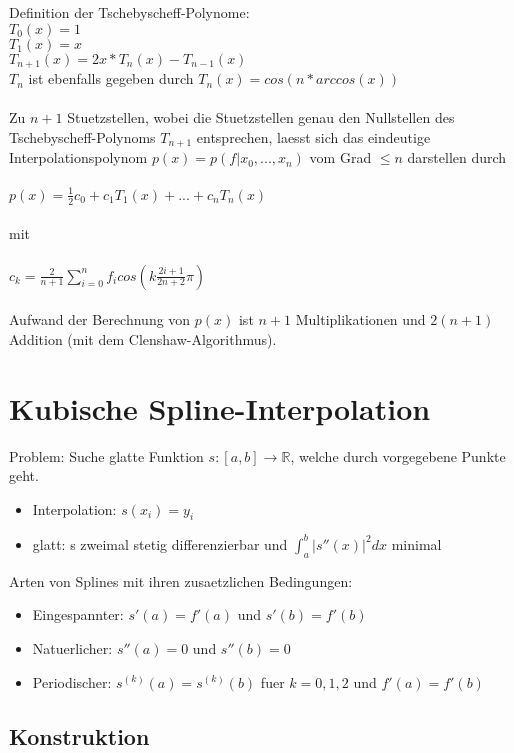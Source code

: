 \documentclass[a4paper]{scrreprt}
\begin{document}
Definition der Tschebyscheff-Polynome:\\
$T_0(x) = 1$\\
$T_1(x) = x$\\
$T_{n+1}(x) = 2x * T_n(x)-T_{n-1}(x)$\\

$T_n$ ist ebenfalls gegeben durch $T_n(x) = cos(n*arccos(x))$\\\\

Zu $n+1$ Stuetzstellen, wobei die Stuetzstellen genau den Nullstellen des Tschebyscheff-Polynoms $T_{n+1}$ entsprechen, laesst sich das eindeutige Interpolationspolynom $p(x) = p(f|x_0,...,x_n)$ vom Grad $\leq n$ darstellen durch\\\\
$p(x) = \frac{1}{2}c_0+c_1T_1(x) + ...+ c_nT_n(x)$\\\\
mit\\\\
$c_k = \frac{2}{n+1}\sum_{i=0}^nf_icos(k\frac{2i+1}{2n+2}\pi)$\\\\
Aufwand der Berechnung von $p(x)$ ist $n+1$ Multiplikationen und $2(n+1)$ Addition (mit dem Clenshaw-Algorithmus).

\section{Kubische Spline-Interpolation}

Problem: Suche glatte Funktion $s:[a,b]\rightarrow\mathbb{R}$, welche durch vorgegebene Punkte geht.
\begin{itemize}
	\item Interpolation: $s(x_i) = y_i$
	\item glatt: s zweimal stetig differenzierbar und $\int_a^b|s''(x)|^2dx$ minimal
\end{itemize}

Arten von Splines mit ihren zusaetzlichen Bedingungen:

\begin{itemize}
	\item Eingespannter: $s'(a) = f'(a)$ und $s'(b) = f'(b)$
	\item Natuerlicher: $s''(a) = 0$ und $s''(b) = 0$
	\item Periodischer: $s^{(k)}(a) = s^{(k)}(b)$ fuer $k = 0,1,2$ und $f'(a) = f'(b)$
\end{itemize}

\subsection{Konstruktion}
\end{document}
